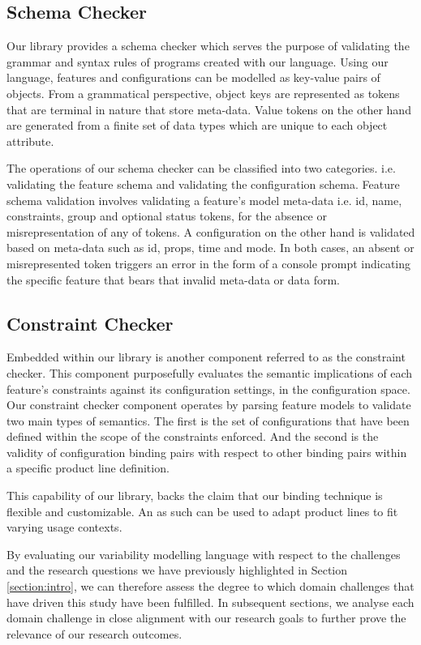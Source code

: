 \documentclass[conference]{IEEEtran}
\begin{document}
  \subsection{Schema Checker} Our library provides a schema checker which serves the purpose of validating the grammar and syntax rules of programs created with our language. Using our language, features and configurations can be modelled as key-value pairs of objects. From a grammatical perspective, object keys are represented as tokens that are terminal in nature that store meta-data. Value tokens on the other hand are generated from a finite set of data types which are unique to each object attribute.
  
  The operations of our schema checker can be classified into two categories. i.e. validating the feature schema and validating the configuration schema. Feature schema validation involves validating a feature's model meta-data i.e. id, name, constraints, group and optional status tokens, for the absence or misrepresentation of any of tokens. A configuration on the other hand is validated based on meta-data such as id, props, time and mode. In both cases, an absent or misrepresented token triggers an error in the form of a console prompt indicating the specific feature that bears that invalid meta-data or data form.
  
  \subsection{Constraint Checker} Embedded within our library is another component referred to as the constraint checker. This component purposefully evaluates the semantic implications of each feature's constraints against its configuration settings, in the configuration space. Our constraint checker component operates by parsing feature models to validate two main types of semantics. The first is the set of configurations that have been defined within the scope of the constraints enforced. And the second is the validity of configuration binding pairs with respect to other binding pairs within a specific product line definition.
  
  This capability of our library, backs the claim that our binding technique is flexible and customizable. An as such can be used to adapt product lines to fit varying usage contexts.


By evaluating our variability modelling language with respect to the challenges and the research questions we have previously highlighted in Section \ref{section:intro}, we can therefore assess the degree to which domain challenges that have driven this study have been fulfilled. In subsequent sections, we analyse each domain challenge in close alignment with our research goals to further prove the relevance of our research outcomes.
\end{document}
